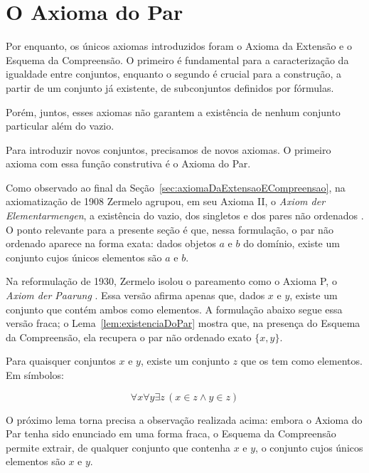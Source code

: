 \section{O Axioma do Par}\label{sec:axiomaDoPar}

Por enquanto, os únicos axiomas introduzidos foram o Axioma da Extensão e o Esquema da Compreensão.
O primeiro é fundamental para a caracterização da igualdade entre conjuntos, enquanto o segundo é crucial para a construção, a partir de um conjunto já existente, de subconjuntos definidos por fórmulas.

Porém, juntos, esses axiomas não garantem a existência de nenhum conjunto particular além do vazio.

Para introduzir novos conjuntos, precisamos de novos axiomas.
O primeiro axioma com essa função construtiva é o Axioma do Par.

Como observado ao final da Seção~\ref{sec:axiomaDaExtensaoECompreensao}, na axiomatização de 1908 Zermelo agrupou, em seu Axioma II, o \emph{Axiom der Elementarmengen}, a existência do vazio, dos singletos e dos pares não ordenados \cite{zermelo1908untersuchungen}.
O ponto relevante para a presente seção é que, nessa formulação, o par não ordenado aparece na forma exata: dados objetos $a$ e $b$ do domínio, existe um conjunto cujos únicos elementos são $a$ e $b$.

Na reformulação de 1930, Zermelo isolou o pareamento como o Axioma P, o \emph{Axiom der Paarung} \cite{zermelo1930grenzzahlen}.
Essa versão afirma apenas que, dados $x$ e $y$, existe um conjunto que contém ambos como elementos.
A formulação abaixo segue essa versão fraca; o Lema~\ref{lem:existenciaDoPar} mostra que, na presença do Esquema da Compreensão, ela recupera o par não ordenado exato $\{x,y\}$.

\begin{axiom}\label{ax:par}
    Para quaisquer conjuntos $x$ e $y$, existe um conjunto $z$ que os tem como elementos.
    Em símbolos:

    \[
    \forall x \forall y \exists z\, (x \in z \land y \in z)
    \]
\end{axiom}

O próximo lema torna precisa a observação realizada acima: embora o Axioma do Par tenha sido enunciado em uma forma fraca, o Esquema da Compreensão permite extrair, de qualquer conjunto que contenha $x$ e $y$, o conjunto cujos únicos elementos são $x$ e $y$.


